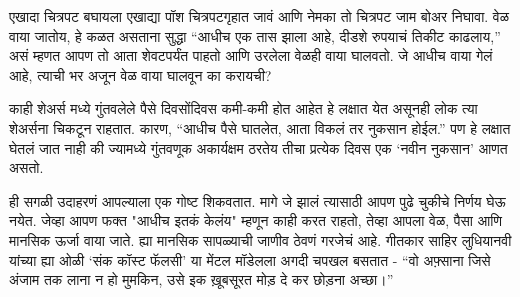 एखादा चित्रपट बघायला एखाद्या पॉश चित्रपटगृहात जावं आणि नेमका तो चित्रपट जाम बोअर निघावा. वेळ वाया जातोय, हे कळत असताना सुद्धा  “आधीच एक तास झाला आहे, दीडशे रुपयाचं तिकीट काढलाय,” असं म्हणत आपण तो आता शेवटपर्यंत पाहतो आणि उरलेला वेळही वाया घालवतो. जे आधीच वाया गेलं आहे, त्याची भर अजून वेळ वाया घालवून का करायची?

काही शेअर्स मध्ये गुंतवलेले पैसे दिवसोंदिवस कमी-कमी होत आहेत हे लक्षात येत असूनही लोक त्या शेअर्सना चिकटून राहतात. कारण, “आधीच पैसे घातलेत, आता विकलं तर नुकसान होईल.” पण हे लक्षात घेतलं जात नाही की ज्यामध्ये गुंतवणूक अकार्यक्षम ठरतेय तीचा प्रत्येक दिवस एक ‘नवीन नुकसान’ आणत असतो.

ही सगळी उदाहरणं आपल्याला एक गोष्ट शिकवतात. मागे जे झालं त्यासाठी आपण पुढे चुकीचे निर्णय घेऊ नयेत. जेव्हा आपण फक्त "आधीच इतकं केलंय" म्हणून काही करत राहतो, तेव्हा आपला वेळ, पैसा आणि मानसिक ऊर्जा वाया जाते. ह्या मानसिक सापळ्याची जाणीव ठेवणं गरजेचं आहे.
गीतकार साहिर लुधियानवी यांच्या ह्या ओळी  ‘संक कॉस्ट फॅलसी’ या मेंटल मॉडेलला अगदी चपखल बसतात - “वो अफ़्साना जिसे अंजाम तक लाना न हो मुमकिन, उसे इक ख़ूबसूरत मोड़ दे कर छोड़ना अच्छा।”
